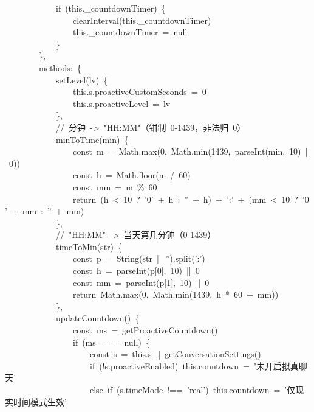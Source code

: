 \documentclass[a4paper,10pt]{article}
\begin{document}
{\ttfamily\footnotesize\raggedright
~~~~~~~~~~~~if~(this.\_countdownTimer)~\{\\
~~~~~~~~~~~~~~~~clearInterval(this.\_countdownTimer)\\
~~~~~~~~~~~~~~~~this.\_countdownTimer~=~null\\
~~~~~~~~~~~~\}\\
~~~~~~~~\},\\
~~~~~~~~methods:~\{\\
~~~~~~~~~~~~setLevel(lv)~\{\\
~~~~~~~~~~~~~~~~this.s.proactiveCustomSeconds~=~0\\
~~~~~~~~~~~~~~~~this.s.proactiveLevel~=~lv\\
~~~~~~~~~~~~\},\\
~~~~~~~~~~~~//~分钟~->~"HH:MM"（钳制~0-1439，非法归~0）\\
~~~~~~~~~~~~minToTime(min)~\{\\
~~~~~~~~~~~~~~~~const~m~=~Math.max(0,~Math.min(1439,~parseInt(min,~10)~||~0))\\
~~~~~~~~~~~~~~~~const~h~=~Math.floor(m~/~60)\\
~~~~~~~~~~~~~~~~const~mm~=~m~\%~60\\
~~~~~~~~~~~~~~~~return~(h~<~10~?~'0'~+~h~:~''~+~h)~+~':'~+~(mm~<~10~?~'0'~+~mm~:~''~+~mm)\\
~~~~~~~~~~~~\},\\
~~~~~~~~~~~~//~"HH:MM"~->~当天第几分钟（0-1439）\\
~~~~~~~~~~~~timeToMin(str)~\{\\
~~~~~~~~~~~~~~~~const~p~=~String(str~||~'').split(':')\\
~~~~~~~~~~~~~~~~const~h~=~parseInt(p[0],~10)~||~0\\
~~~~~~~~~~~~~~~~const~mm~=~parseInt(p[1],~10)~||~0\\
~~~~~~~~~~~~~~~~return~Math.max(0,~Math.min(1439,~h~*~60~+~mm))\\
~~~~~~~~~~~~\},\\
~~~~~~~~~~~~updateCountdown()~\{\\
~~~~~~~~~~~~~~~~const~ms~=~getProactiveCountdown()\\
~~~~~~~~~~~~~~~~if~(ms~===~null)~\{\\
~~~~~~~~~~~~~~~~~~~~const~s~=~this.s~||~getConversationSettings()\\
~~~~~~~~~~~~~~~~~~~~if~(!s.proactiveEnabled)~this.countdown~=~'未开启拟真聊天'\\
~~~~~~~~~~~~~~~~~~~~else~if~(s.timeMode~!==~'real')~this.countdown~=~'仅现实时间模式生效'\\
}
\end{document}
